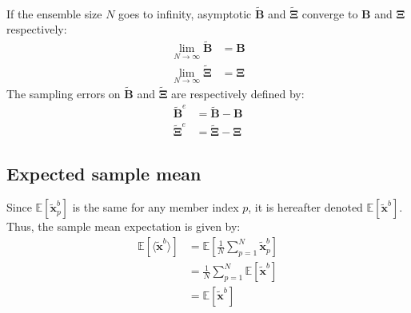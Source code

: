 \documentclass[12pt]{scrartcl}
\begin{document}
$  $\\
If the ensemble size $N$ goes to infinity, asymptotic $\widetilde{\mathbf{B}}$ and $\widetilde{\boldsymbol{\Xi}}$ converge to $\mathbf{B}$ and $\boldsymbol{\Xi}$ respectively:
\begin{subequations}
\begin{align}
\lim_{N \rightarrow \infty} \widetilde{\mathbf{B}} & = \mathbf{B} \\
\lim_{N \rightarrow \infty} \widetilde{\boldsymbol{\Xi}} & = \boldsymbol{\Xi}
\end{align}
\end{subequations}
The sampling errors on $\widetilde{\mathbf{B}}$ and $\widetilde{\boldsymbol{\Xi}}$ are respectively defined by:
\begin{subequations}
\begin{align}
\widetilde{\mathbf{B}}^e & = \widetilde{\mathbf{B}} - \mathbf{B} \\
\widetilde{\boldsymbol{\Xi}}^e & = \widetilde{\boldsymbol{\Xi}} - \boldsymbol{\Xi}
\end{align}
\end{subequations}

\subsection{Expected sample mean}
Since $\mathbb{E} \left[\widetilde{\mathbf{x}}^b_p\right]$ is the same for any member index $p$, it is hereafter denoted $\mathbb{E} \left[\widetilde{\mathbf{x}}^b\right]$. Thus, the sample mean expectation is given by:
\begin{align}
\mathbb{E} \left[\langle \widetilde{\mathbf{x}}^b \rangle\right] & = \mathbb{E} \left[\frac{1}{N} \sum_{p=1}^N \widetilde{\mathbf{x}}^b_p\right] \nonumber \\
& = \frac{1}{N} \sum_{p=1}^N \mathbb{E} \left[\widetilde{\mathbf{x}}^b\right] \nonumber \\
& = \mathbb{E} \left[\widetilde{\mathbf{x}}^b\right]
\end{align}
\end{document}
